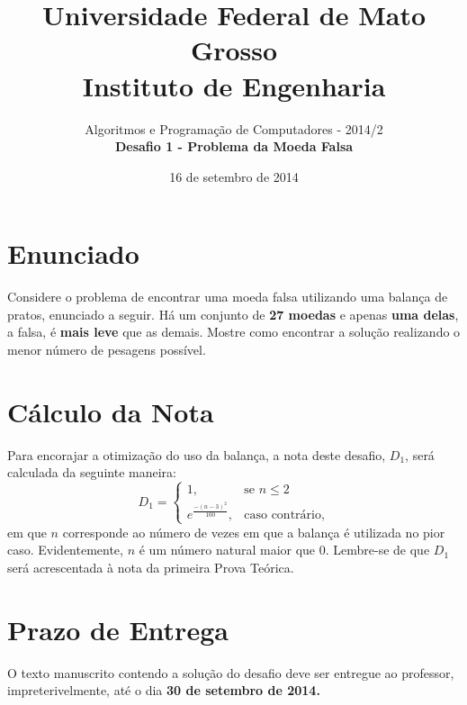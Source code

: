 \documentclass[12pt]{article}
\begin{document}
 
 
\title{Universidade Federal de Mato Grosso\\
Instituto de Engenharia}




\author{Algoritmos e Programa\c{c}\~ao de Computadores - 2014/2 \\
{\bf Desafio 1 - Problema da Moeda Falsa}} %
\date{16 de setembro de 2014}
\maketitle


\section{Enunciado}
Considere o problema de encontrar uma moeda falsa utilizando uma balan\c{c}a de pratos, enunciado a seguir. H\'a um conjunto de {\bf 27 moedas} e apenas {\bf uma delas}, a falsa, \'e {\bf mais leve} que as demais. Mostre como encontrar a solu\c{c}\~ao realizando o menor n\'umero de pesagens poss\'ivel.





\section{C\'alculo da Nota}
Para encorajar a otimiza\c{c}\~ao do uso da balan\c{c}a, a nota deste desafio, $D_1$, ser\'a calculada da seguinte maneira:
\begin{equation}
D_1 = \begin{cases} 1, & \mbox{se } n \leq 2 \\ e^{\frac{-(n-3)^2}{100}}, & \mbox{caso contr\'ario,}  \end{cases}%
\end{equation}
em que $n$ corresponde ao n\'umero de vezes em que a balan\c{c}a \'e utilizada no pior caso. Evidentemente, $n$ \'e um n\'umero natural maior que $0$. Lembre-se de que $D_1$ ser\'a acrescentada \`a nota da primeira Prova Te\'orica.

\section{Prazo de Entrega}

O texto manuscrito contendo a solu\c{c}\~ao do desafio deve ser entregue ao professor, impreteri\-vel\-mente, at\'e o dia {\bf 30 de setembro de 2014.}
\end{document}

